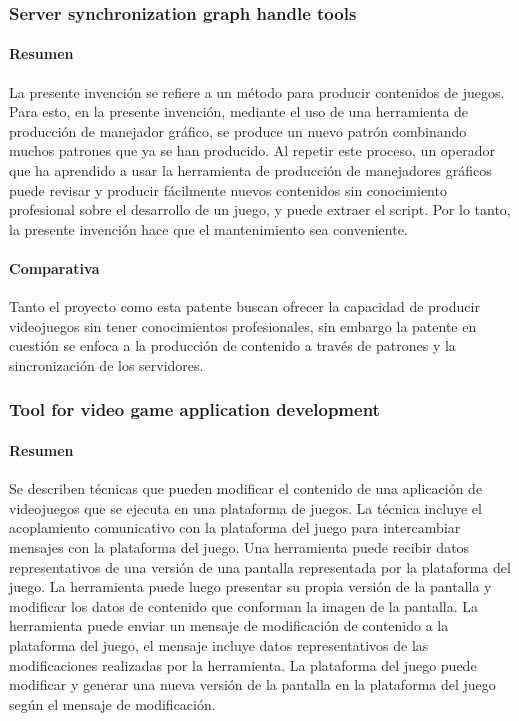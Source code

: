 \documentclass[]{article}
\begin{document}
\subsubsection{Server synchronization graph handle tools}
\paragraph{Resumen} 
La presente invenci\'on se refiere a un m\'etodo para producir contenidos de juegos. Para esto, en la presente invenci\'on, mediante el uso de una herramienta de producci\'on de manejador gr\'afico, se produce un nuevo patr\'on combinando muchos patrones que ya se han producido. Al repetir este proceso, un operador que ha aprendido a usar la herramienta de producci\'on de manejadores gr\'aficos puede revisar y producir f\'acilmente nuevos contenidos sin conocimiento profesional sobre el desarrollo de un juego, y puede extraer el script. Por lo tanto, la presente invenci\'on hace que el mantenimiento sea conveniente.
\cite{Server}
\paragraph{Comparativa}
Tanto el proyecto como esta patente buscan ofrecer la capacidad de producir videojuegos sin tener conocimientos profesionales, sin embargo la patente en cuesti\'on se enfoca a la producci\'on de contenido a trav\'es de patrones y la sincronizaci\'on de los servidores. 














\subsubsection{Tool for video game application development}
\paragraph{Resumen} 
Se describen t\'ecnicas que pueden modificar el contenido de una aplicaci\'on de videojuegos que se ejecuta en una plataforma de juegos. La t\'ecnica incluye el acoplamiento comunicativo con la plataforma del juego para intercambiar mensajes con la plataforma del juego. Una herramienta puede recibir datos representativos de una versi\'on de una pantalla representada por la plataforma del juego. La herramienta puede luego presentar su propia versi\'on de la pantalla y modificar los datos de contenido que conforman la imagen de la pantalla. La herramienta puede enviar un mensaje de modificaci\'on de contenido a la plataforma del juego, el mensaje incluye datos representativos de las modificaciones realizadas por la herramienta. La plataforma del juego puede modificar y generar una nueva versi\'on de la pantalla en la plataforma del juego seg\'un el mensaje de modificaci\'on.
\cite{EA}
\end{document}
